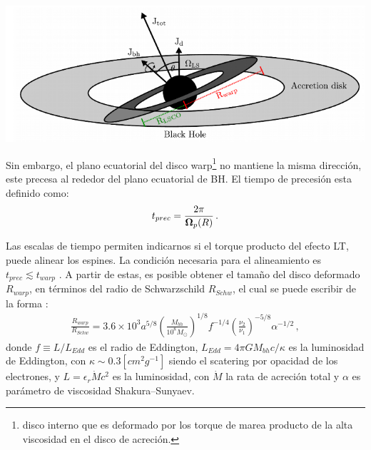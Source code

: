 %
\begin{center}
\includegraphics[scale=.4]{./figures/4_Modelo_Spin/Sistema_con_region_warp.png}
\label{fig: sistema con zona warp}
\end{center}
%
Sin embargo, el plano ecuatorial del disco warp\footnote{disco interno que es deformado por los torque de marea producto de la alta viscosidad en el disco de acreción.} no mantiene la misma dirección, este precesa al rededor del plano ecuatorial de BH. El tiempo de precesión esta definido como:
%
\begin{align}
    t_{prec}= \frac{2\pi}{{\bf{\Omega}}_p(R)}\,.
\end{align}

Las escalas de tiempo permiten indicarnos si el torque producto del efecto LT, puede alinear los espines. La condición necesaria para el alineamiento es $t_{prec}\lesssim t_{warp}$ \cite{natarajan1999}. A partir de estas, es posible obtener el tamaño del disco deformado $R_{warp}$, en términos del radio de Schwarzschild $R_{Schw}$, el cual se puede escribir de la forma \cite{volonteri2007}:
%
\begin{align}
    \frac{R_{warp}}{R_{Schw}}=3.6\times 10^{3}a^{5/8}\left(\frac{M_{bh}}{10^{8}M_{\odot}} \right)^{1/8}f^{-1/4}\left(\frac{\nu_{2}}{\nu_{1}} \right)^{-5/8}\alpha^{-1/2}\,,
\end{align}
%
donde $f\equiv L/L_{Edd}$ es el radio de Eddington, $L_{Edd}=4\pi GM_{bh}c/\kappa$ es  la luminosidad de Eddington, con $\kappa\sim 0.3 [cm^{2}g^{-1}]$ siendo el scatering por opacidad de los electrones, y $L=\epsilon_{r}\dot{M}c^{2}$ es la luminosidad, con $\dot{M}$ la rata de acreción total y $\alpha$ es parámetro de viscosidad Shakura–Sunyaev.

